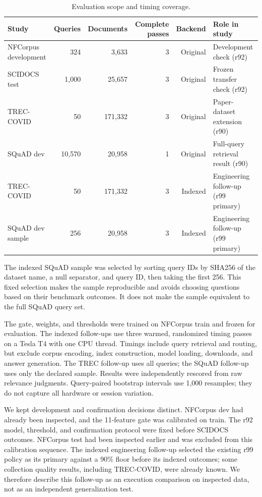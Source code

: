 \documentclass[conference]{IEEEtran}
\begin{document}
\begin{table}[t]
\centering
\caption{Evaluation scope and timing coverage.}
\label{tab:scope}
\small
\begin{tabular}{lrrrrl}
\toprule
Study & Queries & Documents & Complete passes & Backend & Role in study\\
\midrule
NFCorpus development & 324 & 3,633 & 3 & Original & Development check (r92)\\
SCIDOCS test & 1,000 & 25,657 & 3 & Original & Frozen transfer check (r92)\\
TREC-COVID & 50 & 171,332 & 3 & Original & Paper-dataset extension (r90)\\
SQuAD dev & 10,570 & 20,958 & 1 & Original & Full-query retrieval result (r90)\\
TREC-COVID & 50 & 171,332 & 3 & Indexed & Engineering follow-up (r99 primary)\\
SQuAD dev sample & 256 & 20,958 & 3 & Indexed & Engineering follow-up (r99 primary)\\
\bottomrule
\end{tabular}
\end{table}

The indexed SQuAD sample was selected by sorting query IDs by SHA256 of the dataset name, a null separator, and query ID, then taking the first 256. This fixed selection makes the sample reproducible and avoids choosing questions based on their benchmark outcomes. It does not make the sample equivalent to the full SQuAD query set.

The gate, weights, and thresholds were trained on NFCorpus train and frozen for evaluation. The indexed follow-ups use three warmed, randomized timing passes on a Tesla T4 with one CPU thread. Timings include query retrieval and routing, but exclude corpus encoding, index construction, model loading, downloads, and answer generation. The TREC follow-up uses all queries; the SQuAD follow-up uses only the declared sample. Results were independently rescored from raw relevance judgments. Query-paired bootstrap intervals use 1,000 resamples; they do not capture all hardware or session variation.

We kept development and confirmation decisions distinct. NFCorpus dev had already been inspected, and the 11-feature gate was calibrated on train. The r92 model, threshold, and confirmation protocol were fixed before SCIDOCS outcomes. NFCorpus test had been inspected earlier and was excluded from this calibration sequence. The indexed engineering follow-up selected the existing r99 policy as its primary against a 90\% floor before its indexed outcomes; some collection quality results, including TREC-COVID, were already known. We therefore describe this follow-up as an execution comparison on inspected data, not as an independent generalization test.
\end{document}
